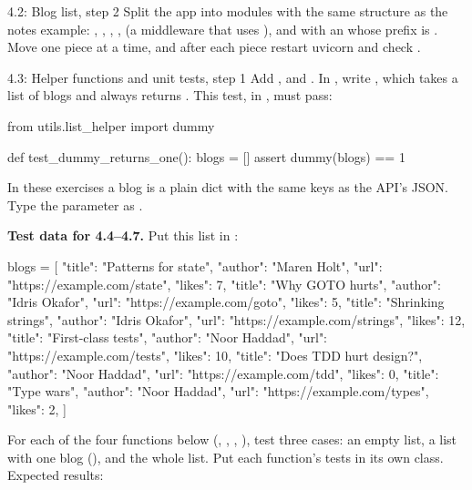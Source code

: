 \begin{exercise}{4.2: Blog list, step 2}
Split the app into modules with the same structure as the notes example: , , , ,  (a  middleware that uses ), and  with an  whose prefix is . Move one piece at a time, and after each piece restart uvicorn and check .
\end{exercise}

\begin{exercise}{4.3: Helper functions and unit tests, step 1}
Add ,  and . In , write , which takes a list of blogs and always returns . This test, in , must pass:
\begin{py}
from utils.list_helper import dummy


def test_dummy_returns_one():
	blogs = []
	assert dummy(blogs) == 1
\end{py}
In these exercises a blog is a plain dict with the same keys as the API's JSON. Type the parameter as .
\end{exercise}

\textbf{Test data for 4.4--4.7.} Put this list in :

\begin{py}
blogs = [
	{"title": "Patterns for state", "author": "Maren Holt",
	 "url": "https://example.com/state", "likes": 7},
	{"title": "Why GOTO hurts", "author": "Idris Okafor",
	 "url": "https://example.com/goto", "likes": 5},
	{"title": "Shrinking strings", "author": "Idris Okafor",
	 "url": "https://example.com/strings", "likes": 12},
	{"title": "First-class tests", "author": "Noor Haddad",
	 "url": "https://example.com/tests", "likes": 10},
	{"title": "Does TDD hurt design?", "author": "Noor Haddad",
	 "url": "https://example.com/tdd", "likes": 0},
	{"title": "Type wars", "author": "Noor Haddad",
	 "url": "https://example.com/types", "likes": 2},
]
\end{py}

For each of the four functions below (, , , ), test three cases: an empty list, a list with one blog (\cd{[blogs[0]]}), and the whole list. Put each function's tests in its own  class. Expected results:

